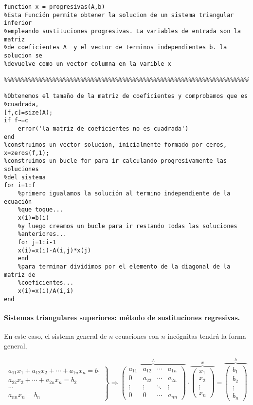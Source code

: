 \begin{verbatim}
function x = progresivas(A,b)
%Esta Función permite obtener la solucion de un sistema triangular inferior
%empleando sustituciones progresivas. La variables de entrada son la matriz
%de coeficientes A  y el vector de terminos independientes b. la solucion se
%devuelve como un vector columna en la varible x

%%%%%%%%%%%%%%%%%%%%%%%%%%%%%%%%%%%%%%%%%%%%%%%%%%%%%%%%%%%%%%%%%%%%%%%%%%%

%Obtenemos el tamaño de la matriz de coeficientes y comprobamos que es
%cuadrada,
[f,c]=size(A);
if f~=c
    error('la matriz de coeficientes no es cuadrada')
end
%construimos un vector solucion, inicialmente formado por ceros,
x=zeros(f,1);
%construimos un bucle for para ir calculando progresivamente las soluciones
%del sistema
for i=1:f
    %primero igualamos la solución al termino independiente de la ecuación
    %que toque...
    x(i)=b(i)
    %y luego creamos un bucle para ir restando todas las soluciones
    %anteriores...
    for j=1:i-1
    x(i)=x(i)-A(i,j)*x(j)
    end
    %para terminar dividimos por el elemento de la diagonal de la matriz de
    %coeficientes...
    x(i)=x(i)/A(i,i)
end
\end{verbatim}

\paragraph{Sistemas triangulares superiores: método de sustituciones regresivas.} En este caso, el sistema general de $n$ ecuaciones con $n$ incógnitas tendrá la forma general,

\begin{equation*}
\left. \begin{aligned}
a_{11}x_1+a_{12}x_2+\cdots +a_{1n}x_n=b_1\\
a_{22}x_2+\cdots +a_{2n}x_n=b_2\\
\cdots  \\
a_{nn}x_n=b_n
\end{aligned}\right\} \Rightarrow	\overbrace{\begin{pmatrix}
a_{11}& a_{12}& \cdots & a_{1n}\\
0& a_{22}& \cdots & a_{2n}\\
\vdots & \vdots & \ddots & \vdots\\
0& 0& \cdots & a_{nn}
\end{pmatrix}}^A \cdot \overbrace{\begin{pmatrix}
x_1\\
x_2\\
\vdots \\
x_n
\end{pmatrix}}^x=\overbrace{\begin{pmatrix}
b_1\\
b_2\\
\vdots \\
b_n
\end{pmatrix}}^b
\end{equation*}


